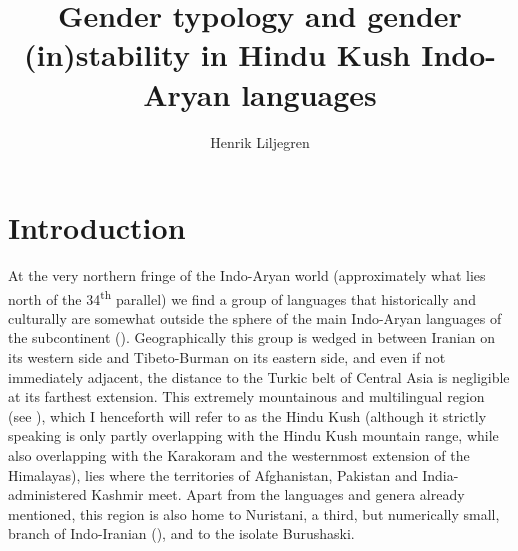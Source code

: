 \documentclass[output=collectionpaper]{langsci/langscibook}
\title{%
Gender typology and gender (in)stability in Hindu Kush Indo-Aryan languages
}%
\author{%
Henrik Liljegren
\affiliation{Stockholm University}
}%
\begin{document}
\label{ch:Liljegren}

\section{Introduction}
\label{sec:Lilje:1}

At the very northern fringe of the Indo-Aryan world (approximately what lies north of the 34\textsuperscript{th} parallel) we find a group of languages that historically and culturally are somewhat outside the sphere of the main Indo-Aryan languages of the subcontinent (\citealt[20--21]{Masica1991}). Geographically this group is wedged in between Iranian on its western side and Tibeto-Burman on its eastern side, and even if not immediately adjacent, the distance to the Turkic belt of Central Asia is negligible at its farthest extension. This extremely mountainous and multilingual region (see ), which I henceforth will refer to as the Hindu Kush (although it strictly speaking is only partly overlapping with the Hindu Kush mountain range, while also overlapping with the Karakoram and the westernmost extension of the Himalayas), lies where the territories of Afghanistan, Pakistan and India-administered Kashmir meet. Apart from the languages and genera already mentioned, this region is also home to Nuristani, a third, but numerically small, branch of Indo-Iranian (\citealt[297--298]{Strand1973}), and to the isolate Burushaski.
\end{document}

